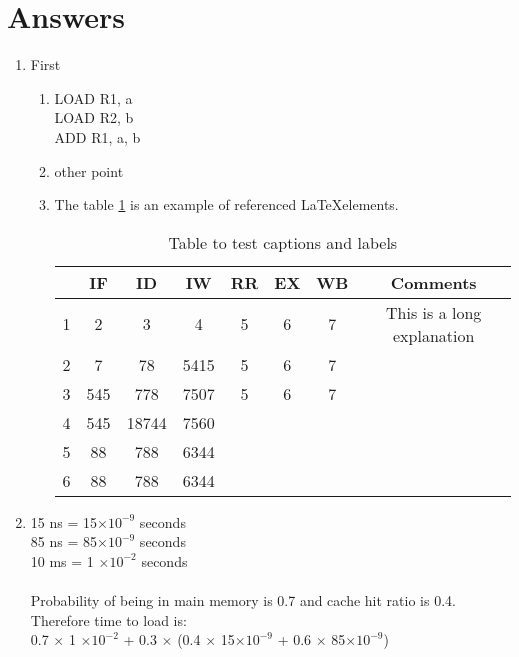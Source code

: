 \documentclass[12pt]{article}
\begin{document}
    \section*{Answers}
    \begin{enumerate}
        \item First
        \begin{enumerate}
            \item LOAD R1, a\\
            LOAD R2, b\\
            ADD R1, a, b
            \item other point
            \item The table \ref{table:1} is an example of referenced \LaTeX elements.
 
            \begin{table}[h!]
            \centering
            \begin{tabular}{||c||c c c c c c c||} 
             \hline
              & IF & ID & IW & RR & EX & WB & Comments\\ [0.5ex] 
             \hline\hline
             1 & 2 & 3 & 4 & 5 & 6 & 7 & This is a long explanation\\ 
             2 & 7 & 78 & 5415 & 5 & 6 & 7 &  \\
             3 & 545 & 778 & 7507 & 5 & 6 & 7 & \\
             4 & 545 & 18744 & 7560 & & & & \\
             5 & 88 & 788 & 6344 & & & & \\  
             6 & 88 & 788 & 6344 & & & & \\
             [1ex]
             \hline
            \end{tabular}
            \caption{Table to test captions and labels}
            \label{table:1}
            \end{table}
        \end{enumerate}
        \item 15 ns = 15$\times 10^{-9}$ seconds\\
        85 ns = 85$\times 10^{-9}$ seconds\\
        10 ms = 1 $\times 10^{-2}$ seconds\\
        \\
        Probability of being in main memory is 0.7 and cache hit ratio is 0.4. Therefore time to load is:\\
        0.7 $\times$ 1 $\times 10^{-2}$ + 0.3 $\times$ (0.4 $\times$ 15$\times 10^{-9}$ + 0.6 $\times$ 85$\times 10^{-9}$)

    \end{enumerate}
\end{document}
